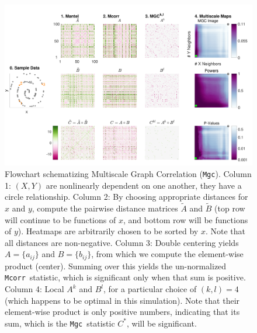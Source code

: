 \documentclass[11pt]{article}
\providecommand{\sct}[1]{{\sc \texttt{#1}}}
\newcommand{\G}{C}
\newcommand{\Mgc}{\sct{Mgc}}
\newcommand{\Mcorr}{\sct{Mcorr}}
\begin{document}
\begin{figure}[htbp]
\includegraphics[width=1.0\textwidth]{../Figures/FigA}
\caption{
Flowchart schematizing Multiscale Graph Correlation (\Mgc).
Column 1: $(X,Y)$ are nonlinearly dependent on one another, they have a circle relationship.
Column 2: By choosing appropriate distances for $x$ and $y$, compute the pairwise distance matrices $\tilde{A}$ and $\tilde{B}$ (top row will continue to be functions of $x$, and bottom row will be functions of $y$).  
Heatmaps  are arbitrarily chosen to be sorted by $x$. 
Note that all distances are non-negative.
Column 3: Double centering yields $A=\{a_{ij}\}$ and $B=\{b_{ij}\}$, from which we compute the element-wise product (center).  Summing over this yields 
the un-normalized \Mcorr~statistic, which is significant only when that sum is positive. 
Column 4: Local $A^{k}$ and $B^{l}$, for a particular choice of $(k,l)=4$ (which happens to be optimal in this simulation). Note that their element-wise product is only positive numbers, indicating that its sum, which is the \Mgc~statistic $\G^*$, will be significant.
}
\end{figure}
\end{document}
